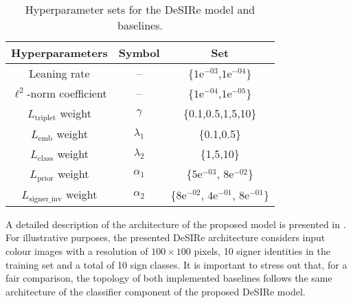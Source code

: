 \begin{table}[t]
    \centering
        \begin{tabular}{c|c|c}
            Hyperparameters                    & Symbol & Set                \\\hline
            Leaning rate                                & --       & \{$1\text{e}^{-03}$,$1\text{e}^{-04}$\}             \\
            $\ell^2$-norm coefficient                              & --      & \{$1\text{e}^{-04}$,$1\text{e}^{-05}$\}             \\
            $L_{\text{triplet}}$ weight                 & $\gamma$                & \{0.1,0.5,1,5,10\}                  \\
            $L_{\text{emb}}$ weight                 & $\lambda_{1}$                & \{0.1,0.5\}                  \\
            $L_{\text{class}}$ weight                 & $\lambda_{2}$                & \{1,5,10\}                  \\
            $L_{\text{prior}}$ weight                 & $\alpha_{1}$                & \{$5\text{e}^{-03}$, $8\text{e}^{-02}$\}                  \\
            $L_{\text{signer\_inv}}$ weight                 & $\alpha_{2}$                & \{$8\text{e}^{-02}$, $4\text{e}^{-01}$, $8\text{e}^{-01}$\}                  \\
        \end{tabular}
    \caption{Hyperparameter sets for the DeSIRe model and baselines.}
    \label{tab:desire_hyperparam}
\end{table}


A detailed description of the architecture of the proposed model is presented in . For illustrative purposes, the presented DeSIRe architecture considers input colour images with a resolution of $100\times 100$ pixels, 10 signer identities in the training set and a total of 10 sign classes. It is important to stress out that, for a fair comparison, the topology of both implemented baselines follows the same architecture of the classifier component of the proposed DeSIRe model.

